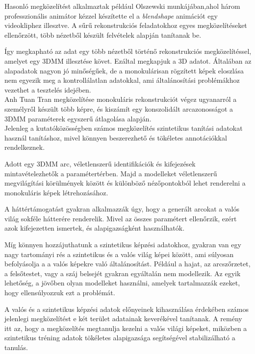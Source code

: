\documentclass[12pt,a4]{article}
\begin{document}
	
	Hasonló megközelítést alkalmaztak például Olszewski \cite{olszewski} munkájában,ahol három professzionális animátor kézzel készítette el a \textit{blendshape} animációt egy videokliphez illesztve. A sűrű rekonstrukciós feladatokhoz egyes megközelítéseket ellenőrzött, több nézetből készült felvételek alapján tanítanak be.
	
	
	Így megkapható az adat egy több nézetből történő rekonstrukciós megközelítéssel, amelyet egy 3DMM illesztése követ. Ezáltal  megkapjuk a 3D adatot. Általában az alapadatok nagyon jó minőségűek,
	de a monokulárisan rögzített képek eloszlása nem
	egyezik meg a kontrollálatlan adatokkal, ami általánosítási problémákhoz vezethet
	a tesztelés idejében.\\
	
	
	Anh Tuan Tran megközelítése monokuláris rekonstrukciót végez ugyanarról a személyről készült több képre, és kiszámít egy konszolidált arcazonosságot a 3DMM paraméterek egyszerű átlagolása alapján. \\
	
	
	Jelenleg a kutatóközösségben számos megközelítés szintetikus tanítási adatokat használ tanításhoz, mivel könnyen beszerezhető és tökéletes annotációkkal rendelkeznek. 
	
	
	Adott egy 3DMM arc, véletlenszerű identifikációk és kifejezések mintavételezhetők a paramétertérben. 
	Majd
	a modelleket véletlenszerű megvilágítási körülmények között és különböző nézőpontokból lehet renderelni a monokuláris képek létrehozásához. 
	
	
	A háttértámogatást gyakran alkalmazzák úgy, hogy a generált arcokat a valós világ sokféle hátterére renderelik. Mivel az összes paramétert ellenőrzik, ezért azok kifejezetten ismertek, és alapigazságként használhatók.
	
	
	Míg könnyen hozzájuthatunk a szintetikus képzési adatokhoz, gyakran van egy nagy tartományi rés
	a szintetikus és a valós világ képei között, ami súlyosan befolyásolja a
	a valós képekre való általánosítást. Például a hajat, az arcszőrzetet, a felsőtestet,
	vagy a száj belsejét gyakran egyáltalán nem modellezik. Az egyik lehetőség,
	a jövőben olyan modelleket használni, amelyek tartalmazzák ezeket, hogy ellensúlyozzuk ezt a problémát. 
	
	
	A valós és a szintetikus képzési adatok előnyeinek kihasználása érdekében számos jelenlegi megközelítést e két terület adatainak keverékével tanítanak. A remény itt az, hogy a megközelítés megtanulja kezelni a valós világi
	képeket, miközben a szintetikus tréning adatok tökéletes alapigazsága
	segítségével stabilizálható a tanulás.\\
\end{document}
